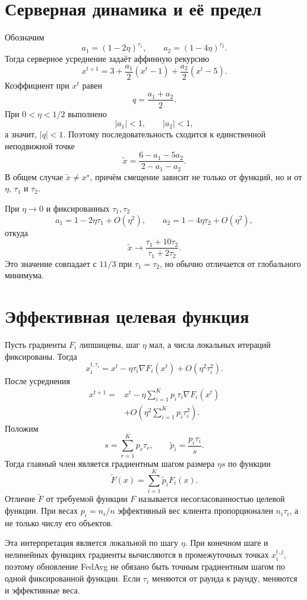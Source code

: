 \section{Серверная динамика и её предел}

Обозначим
\[
    a_1=(1-2\eta)^{\tau_1},
    \qquad
    a_2=(1-4\eta)^{\tau_2}.
\]
Тогда серверное усреднение задаёт аффинную рекурсию
\[
    x^{t+1}
    =
    3+
    \frac{a_1}{2}(x^t-1)
    +
    \frac{a_2}{2}(x^t-5).
\]
Коэффициент при \(x^t\) равен
\[
    q=\frac{a_1+a_2}{2}.
\]
При \(0<\eta<1/2\) выполнено
\[
    |a_1|<1,
    \qquad
    |a_2|<1,
\]
а значит, \(|q|<1\). Поэтому последовательность сходится к
единственной неподвижной точке
\[
    \widetilde x
    =
    \frac{6-a_1-5a_2}{2-a_1-a_2}.
\]
В общем случае \(\widetilde x\ne x^\star\), причём смещение зависит
не только от функций, но и от \(\eta\), \(\tau_1\) и \(\tau_2\).

При \(\eta\to0\) и фиксированных \(\tau_1,\tau_2\)
\[
    a_1=1-2\eta\tau_1+O(\eta^2),
    \qquad
    a_2=1-4\eta\tau_2+O(\eta^2),
\]
откуда
\[
    \widetilde x
    \longrightarrow
    \frac{\tau_1+10\tau_2}{\tau_1+2\tau_2}.
\]
Это значение совпадает с \(11/3\) при
\(\tau_1=\tau_2\), но обычно отличается от глобального минимума.

\section{Эффективная целевая функция}

Пусть градиенты \(F_i\) липшицевы, шаг \(\eta\) мал, а числа
локальных итераций фиксированы. Тогда
\[
    x_i^{t,\tau_i}
    =
    x^t
    -
    \eta\tau_i\nabla F_i(x^t)
    +
    O(\eta^2\tau_i^2).
\]
После усреднения
\[
\begin{aligned}
    x^{t+1}
    ={}&
    x^t
    -
    \eta
    \sum_{i=1}^{K}
    p_i\tau_i\nabla F_i(x^t)
    \\
    &+
    O\left(
        \eta^2
        \sum_{i=1}^{K}p_i\tau_i^2
    \right).
\end{aligned}
\]
Положим
\[
    s=\sum_{r=1}^{K}p_r\tau_r,
    \qquad
    \widetilde p_i=\frac{p_i\tau_i}{s}.
\]
Тогда главный член является градиентным шагом размера \(\eta s\) по
функции
\[
    \widetilde F(x)
    =
    \sum_{i=1}^{K}\widetilde p_iF_i(x).
\]
Отличие \(\widetilde F\) от требуемой функции \(F\) называется
несогласованностью целевой функции. При весах \(p_i=n_i/n\)
эффективный вес клиента пропорционален \(n_i\tau_i\), а не только
числу его объектов.

Эта интерпретация является локальной по шагу \(\eta\). При конечном
шаге и нелинейных функциях градиенты вычисляются в промежуточных
точках \(x_i^{t,j}\), поэтому обновление FedAvg не обязано быть точным
градиентным шагом по одной фиксированной функции. Если \(\tau_i\)
меняются от раунда к раунду, меняются и эффективные веса.

